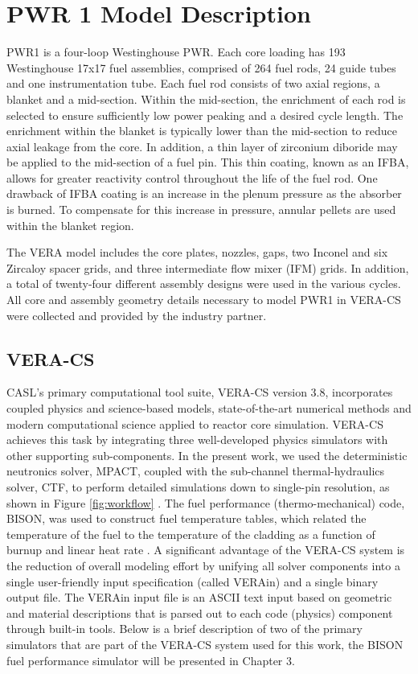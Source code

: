 \documentclass[edeposit,fullpage,11pt]{uiucthesis2009}
\begin{document}
\section{PWR 1 Model Description}
PWR1 is a four-loop Westinghouse PWR.
Each core loading has 193 Westinghouse 17x17 fuel assemblies, comprised of 264 fuel rods, 24 guide tubes and one instrumentation tube. 
Each fuel rod consists of two axial regions, a blanket and a mid-section. 
Within the mid-section, the enrichment of each rod is selected to ensure sufficiently low power peaking and a desired cycle length. 
The enrichment within the blanket is typically lower than the mid-section to reduce axial leakage from the core. 
In addition, a thin layer of zirconium diboride may be applied to the mid-section of a fuel pin. 
This thin coating, known as an \gls{IFBA}, allows for greater reactivity control throughout the life of the fuel rod. 
One drawback of IFBA coating is an increase in the plenum pressure as the absorber is burned. 
To compensate for this increase in pressure, annular pellets are used within the blanket region. 

The VERA model includes the core plates, nozzles, gaps, two Inconel and six Zircaloy spacer grids, and three intermediate flow mixer (IFM) grids. 
In addition, a total of twenty-four different assembly designs were used in the various cycles. 
All core and assembly geometry details necessary to model PWR1 in VERA-CS were collected and provided by the industry partner.


\subsection{VERA-CS}
\gls{CASL}'s primary computational tool suite, VERA-CS version 3.8, incorporates coupled physics and science-based models, state-of-the-art numerical methods and modern computational science applied to reactor core simulation. 
VERA-CS achieves this task by integrating three well-developed physics simulators with other supporting sub-components. 
In the present work, we used the deterministic neutronics solver, MPACT, coupled with the sub-channel thermal-hydraulics solver, CTF, to perform detailed simulations down to single-pin resolution, as shown in Figure \ref{fig:workflow} \cite{zhu_assessment_2014,avramova_ctf:_2009}.
The fuel performance (thermo-mechanical) code, BISON, was used to construct fuel temperature tables, which related the temperature of the fuel to the temperature of the cladding as a function of burnup and linear heat rate \cite{hales_bison_2015}.  
A significant advantage of the VERA-CS system is the reduction of overall modeling effort by unifying all solver components into a single user-friendly input specification (called VERAin) and a single binary output file.
The VERAin input file is an ASCII text input based on geometric and material descriptions that is parsed out to each code (physics) component through built-in tools. 
Below is a brief description of two of the primary simulators that are part of the VERA-CS system used for this work, the BISON fuel performance simulator will be presented in Chapter 3.
\end{document}

